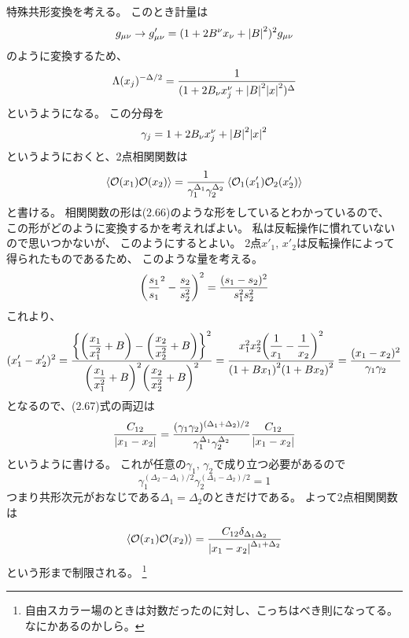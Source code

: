 \documentclass[../../master.tex]{subfiles}
\begin{document}
特殊共形変換を考える。
このとき計量は
\begin{equation*}
    g_{\mu\nu} \rightarrow g'_{\mu\nu} = (1+2B^\nu x_\nu +\abs{B}^2)^2 g_{\mu\nu}
\end{equation*}
のように変換するため、
\begin{equation*}
    \Lambda(x_j)^{-\Delta/2} = \frac{1}{(1+2B_\nu x_j^\nu +\abs{B}^2\abs{x}^2)^{\Delta}}
\end{equation*}
というようになる。
この分母を
\setcounter{equation}{67}
\begin{equation}
    \gamma_j = 1+2B_\nu x_j^\nu +\abs{B}^2\abs{x}^2
\end{equation}
というようにおくと、2点相関関数は
\setcounter{equation}{66}
\begin{equation}
    \ev{\mathcal{O}(x_1)\mathcal{O}(x_2)} = \frac{1}{\gamma_1^{\Delta_1}\gamma_2^{\Delta_2}}\ev{\mathcal{O}_1(x'_1)\mathcal{O}_2(x'_2)}
\end{equation}
と書ける。
\setcounter{equation}{68}
相関関数の形は(2.66)のような形をしているとわかっているので、
この形がどのように変換するかを考えればよい。
私は反転操作に慣れていないので思いつかないが、
このようにするとよい。
2点\(x'_1,\,x'_2\)は反転操作によって得られたものであるため、
このような量を考える。
\begin{equation*}
    \qty(\frac{s_1}{s_1}^2-\frac{s_2}{s_2^2})^2
    =\frac{(s_1-s_2)^2}{s_1^2s_2^2}
\end{equation*}
これより、
\begin{equation}
    (x'_1-x'_2)^2 = \dfrac{\qty{\qty(\dfrac{x_1}{x_1^2}+B)-\qty(\dfrac{x_2}{x_2^2}+B)}^2}{\qty(\dfrac{x_1}{x_1^2}+B)^2\qty(\dfrac{x_2}{x_2^2}+B)^2}
    =\dfrac{x_1^2x_2^2\qty(\dfrac{1}{x_1}-\dfrac{1}{x_2})^2}{\qty(1+Bx_1)^2\qty(1+Bx_2)^2} = \frac{(x_1-x_2)^2}{\gamma_1\gamma_2}
\end{equation}
となるので、(2.67)式の両辺は
\begin{equation}
    \frac{C_{12}}{\abs{x_1-x_2}}=\frac{(\gamma_1\gamma_2)^{(\Delta_1+\Delta_2)/2}}{\gamma_1^{\Delta_1}\gamma_2^{\Delta_2}}\frac{C_{12}}{\abs{x_1-x_2}}
\end{equation}
というように書ける。
これが任意の\(\gamma_1,\,\gamma_2\)で成り立つ必要があるので
\begin{equation*}
    \gamma_1^{(\Delta_2-\Delta_1)/2}\gamma_2^{(\Delta_1-\Delta_2)/2} = 1
\end{equation*}
つまり共形次元がおなじである\(\Delta_1=\Delta_2\)のときだけである。
よって2点相関関数は
\begin{equation}
    \ev{\mathcal{O}(x_1)\mathcal{O}(x_2)}= \frac{C_{12}\delta_{\Delta_1\Delta_2}}{\abs{x_1-x_2}^{\Delta_1 + \Delta_2}}
\end{equation}
という形まで制限される。
\footnote{自由スカラー場のときは対数だったのに対し、こっちはべき則になってる。なにかあるのかしら。}
\end{document}
